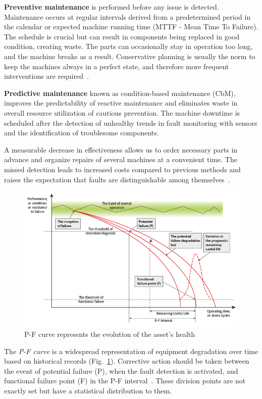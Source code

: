 \textbf{Preventive maintenance} is performed before any issue is detected. Maintenance occurs at regular intervals derived from a predetermined period in the calendar or expected machine running time (MTTF - Mean Time To Failure). The schedule is crucial but can result in components being replaced in good condition, creating waste. The parts can occasionally stay in operation too long, and the machine breaks as a result. Conservative planning is usually the norm to keep the machines always in a perfect state, and therefore more frequent interventions are required~\cite{mohanty_machinery_2015}.

\textbf{Predictive maintenance} known as condition-based maintenance (CbM), improves the predictability of reactive maintenance and eliminates waste in overall resource utilization of cautious prevention. The machine downtime is scheduled after the detection of unhealthy trends in fault monitoring with sensors and the identification of troublesome components.

A measurable decrease in effectiveness allows us to order necessary parts in advance and organize repairs of several machines at a convenient time. The missed detection leads to increased costs compared to previous methods and raises the expectation that faults are distinguishable among themselves~\cite{davies_handbook_2012}.

\begin{figure}[ht]
	\centering
	\includegraphics[width=\textwidth]{assets/analysis/P-F-Curve.png}
	\caption{P-F curve represents the evolution of the asset's health~\cite{jennions_integrated_2011}}
	\label{fig:p-f-curve}
\end{figure}

The \emph{P-F curve} is a widespread representation of equipment degradation over time based on historical records (Fig.~\ref{fig:p-f-curve}). Corrective action should be taken between the event of potential failure (P), when the fault detection is activated, and functional failure point (F) in the P-F interval~\cite{bousdekis_enterprise_2021}.  These division points are not exactly set but have a statistical distribution to them.

